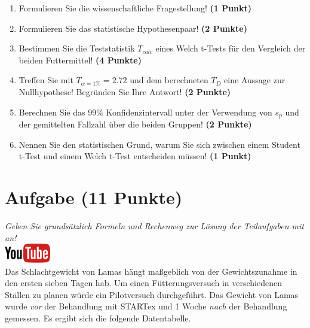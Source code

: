\documentclass[a4paper, 9pt]{scrartcl}\usepackage[]{graphicx}\usepackage[]{xcolor}
\begin{document}
\begin{enumerate}
  \item Formulieren Sie die wissenschaftliche Fragestellung! \textbf{(1 Punkt)}
  \item Formulieren Sie das statistische Hypothesenpaar! \textbf{(2
      Punkte)}
  \item Bestimmen Sie die Teststatistik $T_{calc}$ eines Welch t-Tests f{\"u}r den
  Vergleich der beiden Futtermittel! \textbf{(4 Punkte)}
\item Treffen Sie mit $T_{\alpha = 1\%} = 2.72$ und dem berechneten $T_{D}$ eine Aussage
  zur Nullhypothese! Begr{\"u}nden Sie Ihre Antwort! \textbf{(2 Punkte)}
\item Berechnen Sie das 99\% Konfidenzintervall unter der
  Verwendung von $s_p$ und der gemittelten Fallzahl {\"u}ber die beiden Gruppen! \textbf{(2 Punkte)}
\item Nennen Sie den statistischen Grund, warum Sie sich zwischen einem Student t-Test und einem
  Welch t-Test entscheiden m{\"u}ssen! \textbf{(1 Punkt)}
\end{enumerate} 
\clearpage

\section{Aufgabe \hfill (11 Punkte)}

\textit{Geben Sie grunds{\"a}tzlich Formeln und Rechenweg zur L{\"o}sung der
  Teilaufgaben mit an!} \\[1Ex]

\hfill\href{https://youtu.be/QR90zyn0Iz8}{\includegraphics[width =
  2cm]{img/youtube}}\\[1Ex]



Das Schlachtgewicht von Lamas h{\"a}ngt ma{\ss}geblich von der
Gewichtszunahme in den ersten sieben Tagen hab. Um einen F{\"u}tterungsversuch
in verschiedenen St{\"a}llen zu planen w{\"u}rde ein Pilotversuch durchgef{\"u}hrt. Das
Gewicht von Lamas wurde \textit{vor} der Behandlung mit
STARTex und 1 Woche \textit{nach} der Behandlung gemessen. Es ergibt
sich die folgende Datentabelle.
\end{document}
